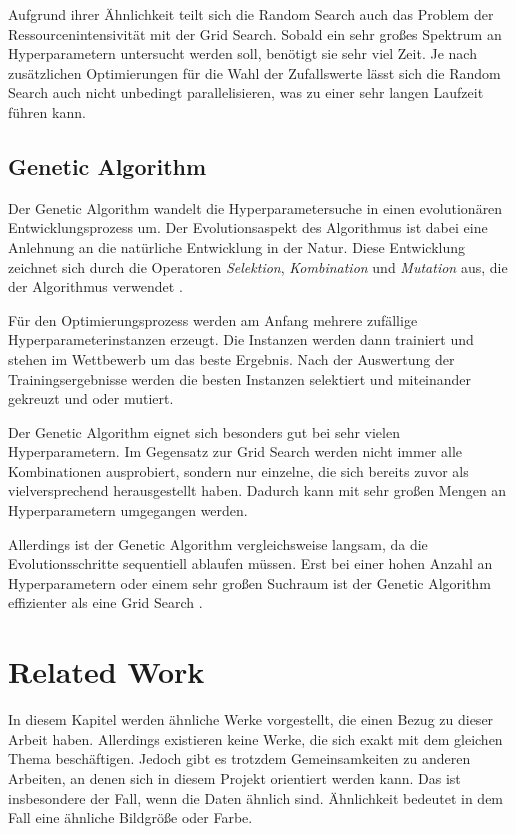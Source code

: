 Aufgrund ihrer Ähnlichkeit teilt sich die Random Search auch das Problem der Ressourcenintensivität mit der Grid Search.
Sobald ein sehr großes Spektrum an Hyperparametern untersucht werden soll, benötigt sie sehr viel Zeit.
Je nach zusätzlichen Optimierungen für die Wahl der Zufallswerte lässt sich die Random Search auch nicht unbedingt parallelisieren, was zu einer sehr langen Laufzeit führen kann.

\subsection{Genetic Algorithm}
Der Genetic Algorithm \cite{hyperparameters-genetic-algorithm} wandelt die Hyperparametersuche in einen evolutionären Entwicklungsprozess um.
Der Evolutionsaspekt des Algorithmus ist dabei eine Anlehnung an die natürliche Entwicklung in der Natur.
Diese Entwicklung zeichnet sich durch die Operatoren \textit{Selektion}, \textit{Kombination} und \textit{Mutation} aus, die der Algorithmus verwendet .
\newline

Für den Optimierungsprozess werden am Anfang mehrere zufällige Hyperparameterinstanzen erzeugt.
Die Instanzen werden dann trainiert und stehen im Wettbewerb um das beste Ergebnis.
Nach der Auswertung der Trainingsergebnisse werden die besten Instanzen selektiert und miteinander gekreuzt und oder mutiert.
\newline

Der Genetic Algorithm eignet sich besonders gut bei sehr vielen Hyperparametern.
Im Gegensatz zur Grid Search werden nicht immer alle Kombinationen ausprobiert, sondern nur einzelne, die sich bereits zuvor als vielversprechend herausgestellt haben.
Dadurch kann mit sehr großen Mengen an Hyperparametern umgegangen werden.
\newline

Allerdings ist der Genetic Algorithm vergleichsweise langsam, da die Evolutionsschritte sequentiell ablaufen müssen.
Erst bei einer hohen Anzahl an Hyperparametern oder einem sehr großen Suchraum ist der Genetic Algorithm effizienter als eine Grid Search \cite{hyperparameters-search-comparison-focus-genetic}.

\section{Related Work}
\label{chapter:related-work}
In diesem Kapitel werden ähnliche Werke vorgestellt, die einen Bezug zu dieser Arbeit haben.
Allerdings existieren keine Werke, die sich exakt mit dem gleichen Thema beschäftigen.
Jedoch gibt es trotzdem Gemeinsamkeiten zu anderen Arbeiten, an denen sich in diesem Projekt orientiert werden kann.
Das ist insbesondere der Fall, wenn die Daten ähnlich sind.
Ähnlichkeit bedeutet in dem Fall eine ähnliche Bildgröße oder Farbe.

